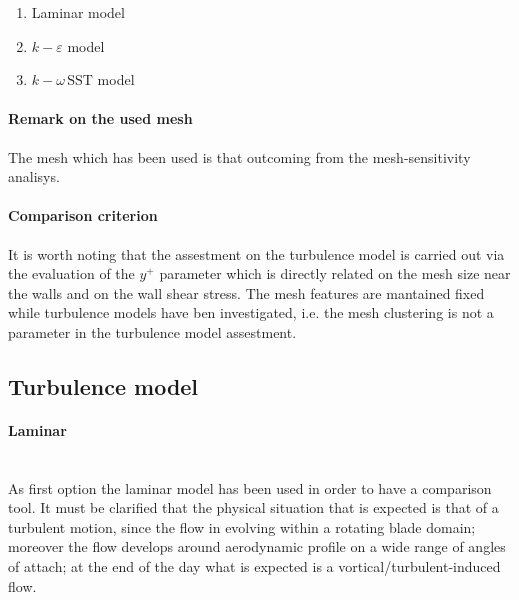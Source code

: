 \documentclass[a4paper,12pt]{article}
\newcommand{\kepsilon}{$k\!-\!\varepsilon $ }
\newcommand{\komegasst}{$k\!-\!\omega \, \text{SST} $ }
\begin{document}
\begin{enumerate}
\item Laminar model
\item \kepsilon model
\item \komegasst model
\end{enumerate}

\paragraph{Remark on the used mesh}
The mesh which has been used is that outcoming from the mesh-sensitivity analisys.

\paragraph{Comparison criterion}
It is worth noting that the assestment on the turbulence model is carried out via the evaluation of the $y^+ $ parameter which is directly related on the mesh size near the walls and on the wall shear stress.
The mesh features are mantained fixed while turbulence models have ben investigated, i.e. the mesh clustering is not a parameter in the turbulence model assestment.


\subsection{Turbulence model}


\paragraph{Laminar}\mbox{}\\
As first option the laminar model has been used in order to have a comparison tool.
It must be clarified that the physical situation that is expected is that of a turbulent motion, since the flow in evolving within a rotating blade domain; moreover the flow develops around aerodynamic profile on a wide range of angles of attach; at the end of the day what is expected is a vortical/turbulent-induced flow.
 
\end{document}
